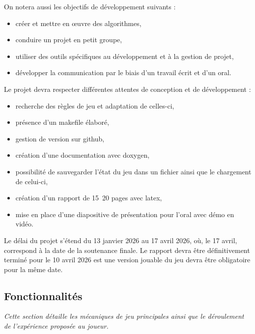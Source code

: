 \documentclass[11pt, a4paper]{article}
\begin{document}
        On notera aussi les objectifs de développement suivants :
        \begin{itemize}
            \item créer et mettre en œuvre des algorithmes,
            \item conduire un projet en petit groupe,
            \item utiliser des outils spécifiques au développement et à la gestion de projet,
            \item développer la communication par le biais d’un travail écrit et d’un oral.\\
        \end{itemize}

        Le projet devra respecter différentes attentes de conception et de développement :
        \begin{itemize}
            \item recherche des règles de jeu et adaptation de celles-ci,
            \item présence d’un \Gls{makefile} élaboré,
            \item gestion de version sur \Gls{github}\cite{bib_github},
            \item création d’une documentation avec \Gls{doxygen}\cite{bib_doxygen},
            \item possibilité de sauvegarder l’état du jeu dans un fichier ainsi que le chargement de celui-ci,
            \item création d’un rapport de 15~20 pages avec \Gls{latex},
            \item mise en place d’une diapositive de présentation pour l’oral avec démo en vidéo.\\
        \end{itemize}

        Le délai du projet s'étend du 13 janvier 2026 au 17 avril 2026, où, le 17 avril, correspond à la date de la soutenance finale. Le rapport devra être définitivement terminé pour le 10 avril 2026 est une version jouable du jeu devra être obligatoire pour la même date.

  \subsection{Fonctionnalités}

    \textit{Cette section détaille les mécaniques de jeu principales ainsi que le déroulement de l'expérience proposée au joueur.} \\
\end{document}
